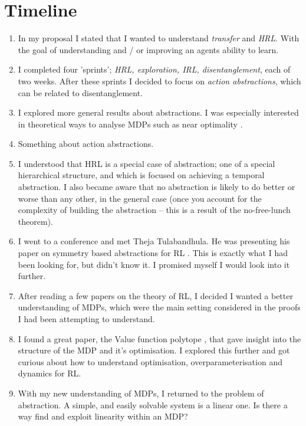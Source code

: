 \documentclass[12pt, a4paper, twoside, openright]{book}
\providecommand{\tightlist}{%
  \setlength{\itemsep}{0pt}\setlength{\parskip}{0pt}}
\begin{document}
\chapter{Timeline}

\begin{enumerate}
  \tightlist
  \item In my proposal I stated that I wanted to understand \textit{transfer} and \textit{HRL}. With the goal of understanding and / or improving an agents ability to learn.
  \item I completed four 'sprints'; \textit{HRL, exploration, IRL, disentanglement}, each of two weeks. After these sprints I decided to focus on \textit{action abstractions},
  which can be related to disentanglement.
  \item I explored more general results about abstractions. I was especially interested in theoretical ways to analyse MDPs such as near optimality \cite{Abel2017}.
  \item Something about action abstractions.
  \item I understood that HRL is a special case of abstraction; one of a special hierarchical structure, and which is focused on achieving a temporal abstraction. I also became aware that no abstraction is likely to do better or worse than any other, in the general case (once you account for the complexity of building the abstraction -- this is a result of the no-free-lunch theorem).
  \item I went to a conference and met Theja Tulabandhula. He was presenting his paper on symmetry based abstractions for RL \cite{Mahajan2017}. This is exactly what I had been looking for, but didn't know it. I promised myself I would look into it further.
  \item After reading a few papers on the theory of RL, I decided I wanted a better understanding of MDPs, which were the main setting considered in the proofs I had been attempting to understand.
  \item I found a great paper, the Value function polytope \cite{Dadashi2018}, that gave insight into the structure of the MDP and it's optimisation. I explored this further and got curious about how to understand optimisation, overparameterisation and dynamics for RL.
  \item With my new understanding of MDPs, I returned to the problem of abstraction. A simple, and easily solvable system is a linear one. Is there a way find and exploit linearity within an MDP?
\end{enumerate}




\end{document}
